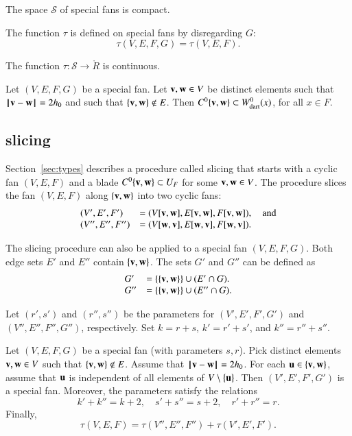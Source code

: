 \begin{lemma}\guid{}
The space ${\mathcal S}$ of special fans is compact.
\end{lemma}

The function $\tau$ is defined on special fans by disregarding $G$:
$$
\tau(V,E,F,G) = \tau(V,E,F).
$$

\begin{lemma}\guid{}
The function $\tau:{\mathcal S}\to \ring{R}$ is continuous.
\end{lemma}

\begin{lemma}\guid{}\rating{}\label{lemma:2hm-slice}
Let $(V,E,F,G)$ be a special fan.  Let ${\mathbf v},{\mathbf w}\in V$ be distinct elements such that ${\hskip0.1em|\hskip-0.15em|\hskip0.1em}{\mathbf v} - {\mathbf w}{\hskip0.1em|\hskip-0.15em|\hskip0.1em}=2{h_0}$ and such that $\{{\mathbf v},{\mathbf w}\}\not\in E$.
Then $C^0\{{\mathbf v},{\mathbf w}\}\subset W^0_{\text{dart}}(x)$, for all $x\in F$.
\end{lemma}


\subsection{slicing}


Section~\ref{sec:types} describes a procedure called slicing that starts with a cyclic fan $(V,E,F)$
and a blade $C^0\{{\mathbf v},{\mathbf w}\} \subset U_F$ for some ${\mathbf v},{\mathbf w}\in V$.  The procedure slices the fan $(V,E,F)$ along $\{{\mathbf v},{\mathbf w}\}$  into two cyclic fans:
$$
\begin{array}{lll}
(V',E',F')&=(V[{\mathbf v},{\mathbf w}],E[{\mathbf v},{\mathbf w}],F[{\mathbf v},{\mathbf w}]),\quad\text{and}\\
 (V'',E'',F'')&= (V[{\mathbf w},{\mathbf v}],E[{\mathbf w},{\mathbf v}],F[{\mathbf w},{\mathbf v}]).
\end{array}
$$


The slicing procedure can also be applied to a special fan $(V,E,F,G)$.
Both edge sets $E'$ and $E''$ contain $\{{\mathbf v},{\mathbf w}\}$.  The sets $G'$ and $G''$ can be defined
as 
$$
\begin{array}{lll}
G' &= \{\{{\mathbf v},{\mathbf w}\}\} \cup (E'\cap G).\\
G'' &= \{\{{\mathbf v},{\mathbf w}\}\} \cup (E''\cap G).\\
\end{array}
$$ 

Let $(r',s')$ and $(r'',s'')$ be the parameters for $(V',E',F',G')$ and $(V'',E'',F'',G'')$, respectively.
Set $k=r+s$, $k'=r'+s'$, and $k''=r''+s''$.

\begin{lemma}\rating{}  Let $(V,E,F,G)$ be a special fan (with parameters $s,r$).  
Pick distinct elements ${\mathbf v},{\mathbf w}\in V$  such that $\{{\mathbf v},{\mathbf w}\}\not\in E$.
Assume that ${\hskip0.1em|\hskip-0.15em|\hskip0.1em}{\mathbf v} - {\mathbf w}{\hskip0.1em|\hskip-0.15em|\hskip0.1em}=2{h_0}$.
For each ${\mathbf u}\in \{{\mathbf v},{\mathbf w}\}$, assume that ${\mathbf u}$ is independent of all elements of $V\setminus\{{\mathbf u}\}$.    
Then $(V',E',F',G')$ is a special fan.  Moreover,
the parameters satisfy the relations
$$
k'+k'' = k + 2,\quad s'+s'' = s + 2,\quad r'+r''=r.
$$
Finally,
$$
\tau(V,E,F)= \tau(V'',E'',F'') +\tau(V',E',F').
$$
\end{lemma}

